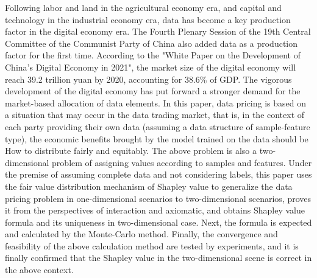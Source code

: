 \let\cleardoublepage\clearpage
\begin{abstracten} %



Following labor and land in the agricultural economy era, and capital and technology in the industrial economy era, data has become a key production factor in the digital economy era. The Fourth Plenary Session of the 19th Central Committee of the Communist Party of China also added data as a production factor for the first time. According to the "White Paper on the Development of China's Digital Economy in 2021", the market size of the digital economy will reach 39.2 trillion yuan by 2020, accounting for 38.6\% of GDP. The vigorous development of the digital economy has put forward a stronger demand for the market-based allocation of data elements. In this paper, data pricing is based on a situation that may occur in the data trading market, that is, in the context of each party providing their own data (assuming a data structure of sample-feature type), the economic benefits brought by the model trained on the data should be How to distribute fairly and equitably. The above problem is also a two-dimensional problem of assigning values ​​according to samples and features. Under the premise of assuming complete data and not considering labels, this paper uses the fair value distribution mechanism of Shapley value to generalize the data pricing problem in one-dimensional scenarios to two-dimensional scenarios, proves it from the perspectives of interaction and axiomatic, and obtains Shapley value formula and its uniqueness in two-dimensional case. Next, the formula is expected and calculated by the Monte-Carlo method. Finally, the convergence and feasibility of the above calculation method are tested by experiments, and it is finally confirmed that the Shapley value in the two-dimensional scene is correct in the above context.



\end{abstracten}

\let\cleardoublepage\clearpage
\tableofcontents %

\mainmatter
\let\cleardoublepage\clearpage
